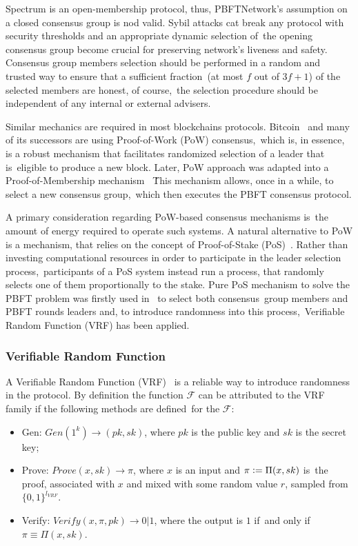 Spectrum is an open-membership protocol, thus, PBFTNetwork's assumption on a closed consensus group is nod valid.
Sybil attacks cat break any protocol with security thresholds and an appropriate dynamic selection of\
the opening consensus group become crucial for preserving network's liveness and safety.
Consensus group members selection should be performed in a random and trusted way to ensure that a sufficient fraction\
(at most $f$ out of ${3 f + 1}$) of the selected members are honest, of course,\
the selection procedure should be independent of any internal or external advisers.

Similar mechanics are required in most blockchains protocols.
Bitcoin~\cite{nakamoto2009bitcoin} and many of its successors are using Proof-of-Work (PoW) consensus,\
which is, in essence, is a robust mechanism that facilitates randomized selection of a leader that is\
eligible to produce a new block.
Later, PoW approach was adapted into a Proof-of-Membership mechanism ~\cite{kokoriskogias2016enhancing}\.
This mechanism allows, once in a while, to select a new consensus group,\
which then executes the PBFT consensus protocol.

A primary consideration regarding PoW-based consensus mechanisms is\
the amount of energy required to operate such systems.
A natural alternative to PoW is a mechanism, that relies on the concept of Proof-of-Stake (PoS)~\cite{King2012PPCoinPC}.
Rather than investing computational resources in order to participate in the leader selection process,\
participants of a PoS system instead run a process, that randomly selects one of them proportionally to the stake.
Pure PoS mechanism to solve the PBFT problem was firstly used in~\cite{cryptoeprint:2017/454} to select both consensus\
group members and PBFT rounds leaders and, to introduce randomness into this process,\
Verifiable Random Function (VRF) has been applied.

\subsubsection{Verifiable Random Function}

A Verifiable Random Function (VRF)~\cite{Micali1999} is a reliable way to introduce randomness in the protocol.
By definition the function $\mathcal{F}$ can be attributed to the VRF family if the following methods are defined\
for the $\mathcal{F}$:
\begin{itemize}
    \item Gen: ${Gen(1^k) \rightarrow (pk, sk)}$, where $pk$ is the public key and $sk$ is the secret key;
    \item Prove: ${Prove(x, sk) \rightarrow \pi}$, where $x$ is an input and $\pi \vcentcolon= \Pi(x, sk)$ is\
    the proof, associated with $x$ and mixed with some random value $r$, sampled from $\{0,1\}^{l_{VRF}}$.
    \item Verify: ${Verify(x, \pi, pk) \rightarrow 0 | 1}$, where the output is $1$ if\
    and only if ${\pi \equiv \Pi(x, sk)}$.
\end{itemize}

